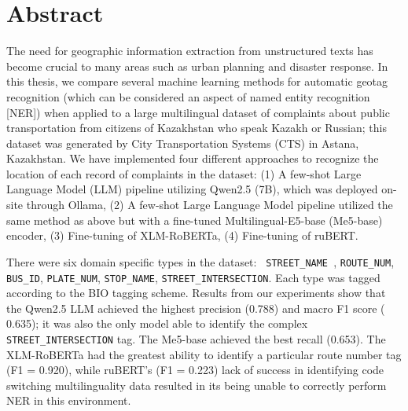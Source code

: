 %
%
\chapter*{Abstract}

The need for geographic information extraction from unstructured texts has become crucial to many areas such as urban planning and disaster response. In this thesis, we compare several machine learning methods for automatic geotag recognition (which can be considered an aspect of named entity recognition [NER]) when applied to a large multilingual dataset of complaints about public transportation from citizens of Kazakhstan who speak Kazakh or Russian; this dataset was generated by City Transportation Systems (CTS) in Astana, Kazakhstan. We have implemented four different approaches to recognize the location of each record of complaints in the dataset: (1) A few-shot Large Language Model (LLM) pipeline utilizing Qwen2.5 (7B), which was deployed on-site through Ollama, (2) A few-shot Large Language Model pipeline utilized the same method as above but with a fine-tuned Multilingual-E5-base (Me5-base) encoder, (3) Fine-tuning of XLM-RoBERTa, (4) Fine-tuning of ruBERT.

There were six domain specific types in the dataset: \texttt{ STREET\_NAME }, \texttt{ROUTE\_NUM}, \texttt{BUS\_ID}, \texttt{PLATE\_NUM}, \texttt{STOP\_NAME}, \texttt{STREET\_INTERSECTION}. Each type was tagged according to the BIO tagging scheme. Results from our experiments show that the Qwen2.5 LLM achieved the highest precision (0.788) and macro F1 score ( 0.635); it was also the only model able to identify the complex \texttt{STREET\_INTERSECTION} tag. The Me5-base achieved the best recall (0.653). The XLM-RoBERTa had the greatest ability to identify a particular route number tag (F1 = 0.920), while ruBERT's (F1 = 0.223) lack of success in identifying code switching multilinguality data resulted in its being unable to correctly perform NER in this environment. 


\bigskip
{}

\clearpage
